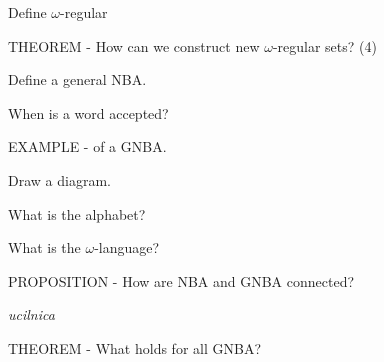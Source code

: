 \documentclass[fleqn]{article}
\begin{document}
\begin{enumerate}
    {\color{red}\item Define $\omega$-regular }
    {\color{red}\item THEOREM - How can we construct new $\omega$-regular sets? (4)}
    {\color{red}\item Define a general NBA.}
    {\color{red}\item When is a word accepted?}
    \item EXAMPLE - of a GNBA.
    \begin{itemize}
        {\color{red}\item Draw a diagram.}
        \item What is the alphabet?
        {\color{red}\item What is the $\omega$-language?}
    \end{itemize}
    {\color{blue}\item PROPOSITION - How are NBA and GNBA connected?} \textit{ucilnica}
    {\color{blue}\item THEOREM - What holds for all GNBA?}
\end{enumerate}
\end{document}
